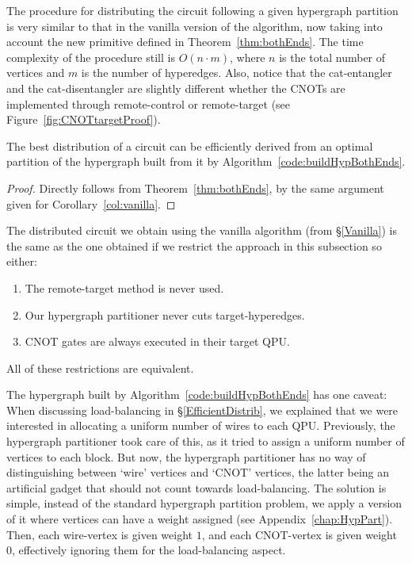 

The procedure for distributing the circuit following a given hypergraph partition is very similar to that in the vanilla version of the algorithm, now taking into account the new primitive defined in Theorem~\ref{thm:bothEnds}. The time complexity of the procedure still is \(O(n\cdot m)\), where \(n\) is the total number of vertices and \(m\) is the number of hyperedges. Also, notice that the cat-entangler and the cat-disentangler are slightly different whether the CNOTs are implemented through remote-control or remote-target (see Figure~\ref{fig:CNOTtargetProof}).

\begin{corollary}
The best distribution of a circuit can be efficiently derived from an optimal partition of the hypergraph built from it by Algorithm~\ref{code:buildHypBothEnds}.
\label{col:bothEnds}
\end{corollary}
\begin{proof}
Directly follows from Theorem~\ref{thm:bothEnds}, by the same argument given for Corollary~\ref{col:vanilla}. 

\end{proof}

\begin{corollary}
The distributed circuit we obtain using the vanilla algorithm (from \S\ref{Vanilla}) is the same as the one obtained if we restrict the approach in this subsection so either:
\begin{enumerate}
  \renewcommand{\theenumi}{\alph{enumi})}
  \item The remote-target method is never used.
  \item Our hypergraph partitioner never cuts target-hyperedges.
  \item CNOT gates are always executed in their target QPU.
\end{enumerate}
All of these restrictions are equivalent.
\end{corollary}

The hypergraph built by Algorithm~\ref{code:buildHypBothEnds} has one caveat: When discussing load-balancing in \S\ref{EfficientDistrib}, we explained that we were interested in allocating a uniform number of wires to each QPU. Previously, the hypergraph partitioner took care of this, as it tried to assign a uniform number of vertices to each block. But now, the hypergraph partitioner has no way of distinguishing between `wire' vertices and `CNOT' vertices, the latter being an artificial gadget that should not count towards load-balancing. The solution is simple, instead of the standard hypergraph partition problem, we apply a version of it where vertices can have a weight assigned (see Appendix~\ref{chap:HypPart}). Then, each wire-vertex is given weight \(1\), and each CNOT-vertex is given weight \(0\), effectively ignoring them for the load-balancing aspect.

